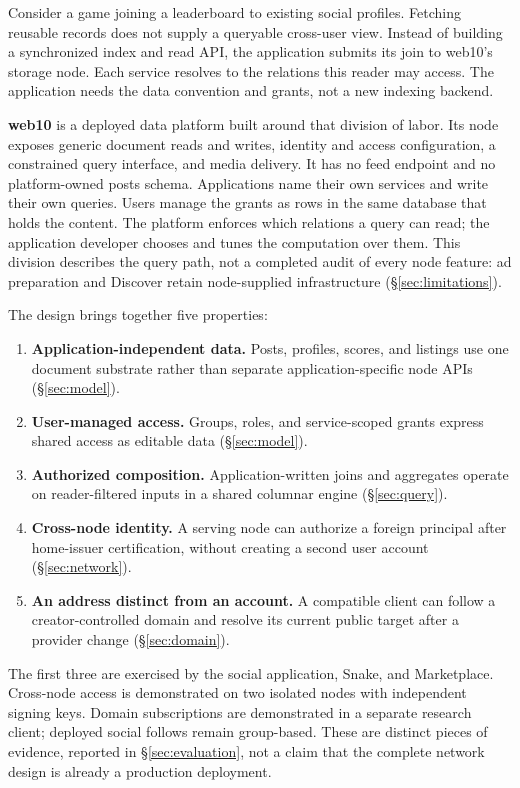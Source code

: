 \documentclass[sigconf, nonacm]{acmart}
\begin{document}
Consider a game joining a leaderboard to existing social profiles.
Fetching reusable records does not supply a queryable cross-user view.
Instead of building a synchronized index and read API, the application
submits its join to web10's storage node. Each service resolves to the
relations this reader may access. The application needs the data
convention and grants, not a new indexing backend.

\textbf{web10} is a deployed data platform built around that division of
labor. Its node exposes generic document reads and writes, identity and
access configuration, a constrained query interface, and media delivery.
It has no feed endpoint and no platform-owned posts schema. Applications
name their own services and write their own queries. Users manage the
grants as rows in the same database that holds the content. The platform
enforces which relations a query can read; the application developer
chooses and tunes the computation over them. This division describes the
query path, not a completed audit of every node feature: ad preparation
and Discover retain node-supplied infrastructure (\S\ref{sec:limitations}).

The design brings together five properties:
\begin{enumerate}[leftmargin=*,nosep]
\item \textbf{Application-independent data.} Posts, profiles, scores,
and listings use one document substrate rather than separate
application-specific node APIs (\S\ref{sec:model}).
\item \textbf{User-managed access.} Groups, roles, and service-scoped
grants express shared access as editable data (\S\ref{sec:model}).
\item \textbf{Authorized composition.} Application-written joins and
aggregates operate on reader-filtered inputs in a shared columnar
engine (\S\ref{sec:query}).
\item \textbf{Cross-node identity.} A serving node can authorize a
foreign principal after home-issuer certification, without creating a
second user account (\S\ref{sec:network}).
\item \textbf{An address distinct from an account.} A compatible client
can follow a creator-controlled domain and resolve its current public
target after a provider change (\S\ref{sec:domain}).
\end{enumerate}

The first three are exercised by the social application, Snake, and
Marketplace. Cross-node access is demonstrated on two isolated nodes
with independent signing keys. Domain subscriptions are demonstrated
in a separate research client; deployed social follows remain
group-based. These are distinct pieces of evidence, reported in
\S\ref{sec:evaluation}, not a claim that the complete network design is
already a production deployment.
\end{document}
